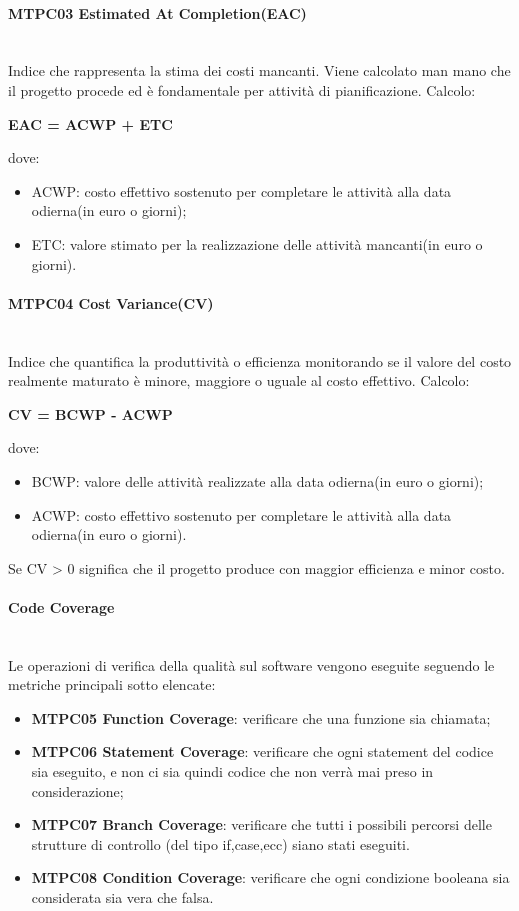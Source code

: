 \paragraph{MTPC03 Estimated At Completion(EAC)}\-\\
Indice che rappresenta la stima dei costi mancanti. Viene calcolato man mano che il progetto procede ed è fondamentale per attività di pianificazione.
Calcolo:
\begin{center}
	\item \textbf{EAC = ACWP + ETC}
\end{center}
dove:
\begin{itemize}
	\item ACWP: costo effettivo sostenuto per completare le attività alla data odierna(in euro o giorni);
	\item ETC: valore stimato per la realizzazione delle attività mancanti(in euro o giorni).
\end{itemize}

\paragraph{MTPC04 Cost Variance(CV)}\-\\
Indice che quantifica la produttività o efficienza monitorando se il valore del costo realmente maturato è minore, maggiore o uguale al costo effettivo.
Calcolo:
\begin{center}
	\item \textbf{CV = BCWP - ACWP}
\end{center}
dove:
\begin{itemize}
	\item BCWP: valore delle attività realizzate alla data odierna(in euro o giorni);
	\item ACWP: costo effettivo sostenuto per completare le attività alla data odierna(in euro o giorni).
\end{itemize}
Se CV > 0 significa che il progetto produce con maggior efficienza e minor costo.

\paragraph{Code Coverage}\-\\
Le operazioni di verifica della qualità sul software vengono eseguite seguendo le metriche principali sotto elencate:
\begin{itemize}
	\item \textbf{MTPC05 Function Coverage}: verificare che una funzione sia chiamata;
	\item \textbf{MTPC06 Statement Coverage}: verificare che ogni statement del codice sia eseguito, e non ci sia quindi codice che non verrà mai preso in considerazione;
	\item \textbf{MTPC07 Branch Coverage}: verificare che tutti i possibili percorsi delle strutture di controllo (del tipo if,case,ecc) siano stati eseguiti.
	\item \textbf{MTPC08 Condition Coverage}: verificare che ogni condizione booleana sia considerata sia vera che falsa.
\end{itemize}


